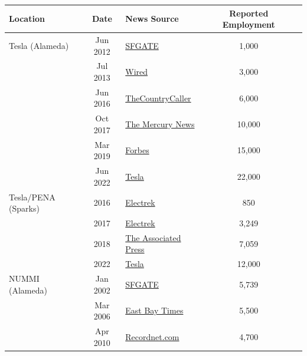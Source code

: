 \documentclass[sn-mathphys,Numbered]{sn-jnl}%
\begin{document}
\begin{appendices}
\begin{table}[ht]
    \centering
    \begin{tabular}{lclcc}
        Location & Date & News Source & Reported Employment \\
        \toprule
        Tesla (Alameda) & Jun 2012 & \href{https://www.sfgate.com/business/article/Tesla-starts-delivery-out-of-former-Nummi-plant-3653530.php}{SFGATE} & 1,000 \\
         & Jul 2013  & \href{https://www.wired.com/2013/07/tesla-plant-video/}{Wired} & 3,000 \\
         & Jun 2016 & \href{https://web.archive.org/web/20160716082915/http://www.thecountrycaller.com/40182-tesla-motors-tsla-workers-being-contacted-by-uaw-for-union-formation/}{TheCountryCaller} & 6,000 \\
         & Oct 2017 & \href{https://www.mercurynews.com/2017/10/13/4819750/}{The Mercury News} & 10,000 \\
         & Mar 2019 & \href{https://www.forbes.com/sites/alanohnsman/2019/03/01/tesla-safety-violations-dwarf-big-us-auto-plants-in-aftermath-of-musks-model-3-push/?sh=66dae5a454ce}{Forbes} & 15,000 \\
         & Jun 2022 & \href{https://web.archive.org/web/20220628005146/https://www.tesla.com/factory}{Tesla} & 22,000 \\
         \midrule 
        Tesla/PENA (Sparks) & 2016 & \href{https://electrek.co/2016/12/08/tesla-gigafactory-workers-2017-production-ramp-up/}{Electrek} & 850 \\
         & 2017 & \href{https://electrek.co/2018/08/21/tesla-gigafactory-1-3000-workers/}{Electrek} & 3,249 \\
         & 2018 & \href{https://apnews.com/general-news-2ffa3542a4b948c990f2f49ffd40621d}{The Associated Press} & 7,059 \\
         & 2022 & \href{https://web.archive.org/web/20191031042238/http://www.diversifynevada.com/wp-content/uploads/2018/07/2019_1001_NRS-360.975-3.5b-Tesla-Annual-Report.pdf}{Tesla} & 12,000 \\
        \midrule
         NUMMI (Alameda) & Jan 2002 & \href{https://www.sfgate.com/bayarea/article/Nummi-workers-say-their-final-good-byes-3194045.php}{SFGATE} & 5,739 \\ 
         & Mar 2006 & \href{https://www.eastbaytimes.com/2006/03/05/nummi-plant-a-model-for-ailing-car-industry/}{East Bay Times} & 5,500 \\
         & Apr 2010 & \href{https://www.recordnet.com/story/news/2010/04/02/end-nummi/51640719007/}{Recordnet.com} & 4,700 \\

\end{tabular}
\end{table}
\end{appendices}
\end{document}
